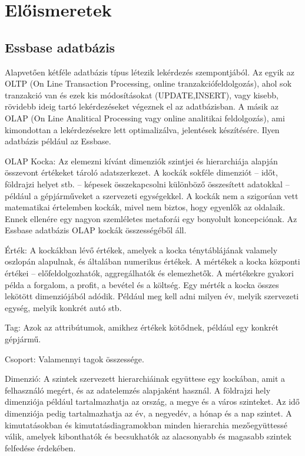 \chapter{Előismeretek}\label{sect:Preliminaries}
\section{Essbase adatbázis}
Alapvetően kétféle adatbázis típus létezik lekérdezés szempontjából. Az egyik az OLTP (On Line Transaction Processing, online tranzakciófeldolgozás), ahol sok tranzakció van és ezek kis módosításokat (UPDATE,INSERT), vagy kisebb, rövidebb ideig tartó lekérdezéseket végeznek el az adatbázisban. A másik az OLAP (On Line Analitical Processing vagy online analitikai feldolgozás), ami kimondottan a lekérdezésekre lett optimalizálva, jelentések készítésére. Ilyen adatbázis például az Essbase.

OLAP Kocka:     Az elemezni kívánt dimenziók szintjei és hierarchiája alapján összevont értékeket tároló adatszerkezet. A kockák sokféle dimenziót – időt, földrajzi helyet stb. – képesek összekapcsolni különböző összesített adatokkal – például a gépjárműveket a szervezeti egységekkel. A kockák nem a szigorúan vett matematikai értelemben kockák, mivel nem biztos, hogy egyenlők az oldalaik. Ennek ellenére egy nagyon szemléletes metaforái egy bonyolult koncepciónak. Az Essbase adatbázis OLAP kockák összességéből áll.

Érték: A kockákban lévő értékek, amelyek a kocka ténytáblájának valamely oszlopán alapulnak, és általában numerikus értékek. A mértékek a kocka központi értékei – előfeldolgozhatók, aggregálhatók és elemezhetők. A mértékekre gyakori példa a forgalom, a profit, a bevétel és a költség. Egy mérték a kocka összes lekötött dimenziójából adódik. Például meg kell adni milyen év, melyik szervezeti egység, melyik konkrét autó stb.

Tag: Azok az attribútumok, amikhez értékek kötődnek, például egy konkrét gépjármű.

Csoport: Valamennyi tagok összessége.

Dimenzió: A szintek szervezett hierarchiáinak együttese egy kockában, amit a felhasználó megért, és az adatelemzés alapjaként használ. A földrajzi hely dimenziója például tartalmazhatja az ország, a megye és a város szinteket. Az idő dimenziója pedig tartalmazhatja az év, a negyedév, a hónap és a nap szintet. A kimutatásokban és kimutatásdiagramokban minden hierarchia mezőegyüttessé válik, amelyek kibonthatók és becsukhatók az alacsonyabb és magasabb szintek felfedése érdekében.

